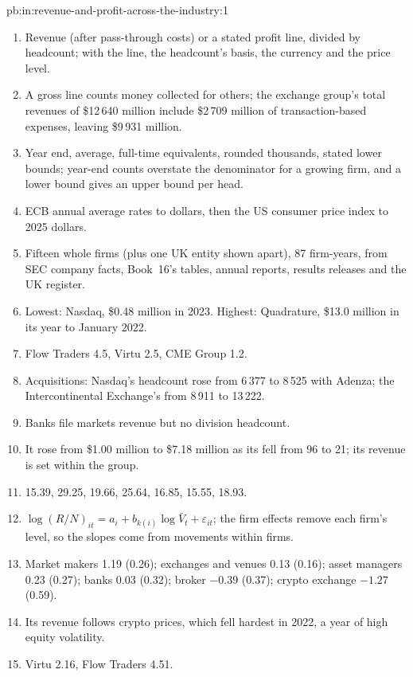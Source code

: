 \begin{solution}{pb:in:revenue-and-profit-across-the-industry:1}
\begin{enumerate}
\item Revenue (after pass-through costs) or a stated profit line, divided by headcount; with the line, the headcount's
basis, the currency and the price level.
\item A gross line counts money collected for others; the exchange group's total revenues of \$12\,640 million include
\$2\,709 million of transaction-based expenses, leaving \$9\,931 million.
\item Year end, average, full-time equivalents, rounded thousands, stated lower bounds; year-end counts overstate the
denominator for a growing firm, and a lower bound gives an upper bound per head.
\item ECB annual average rates to dollars, then the US consumer price index to 2025 dollars.
\item Fifteen whole firms (plus one UK entity shown apart), 87 firm-years, from SEC company facts, Book~16's tables,
annual reports, results releases and the UK register.
\item Lowest: Nasdaq, \$0.48 million in 2023. Highest: Quadrature, \$13.0 million in its year to January 2022.
\item Flow Traders 4.5, Virtu 2.5, CME Group 1.2.
\item Acquisitions: Nasdaq's headcount rose from 6\,377 to 8\,525 with Adenza; the Intercontinental Exchange's from
8\,911 to 13\,222.
\item Banks file markets revenue but no division headcount.
\item It rose from \$1.00 million to \$7.18 million as its  fell from 96 to 21; its revenue is set within
the group.
\item 15.39, 29.25, 19.66, 25.64, 16.85, 15.55, 18.93.
\item $\log(R/N)_{it}=a_i+b_{k(i)}\log\bar V_t+\varepsilon_{it}$; the firm effects remove each firm's level, so the
slopes come from movements within firms.
\item Market makers 1.19 (0.26); exchanges and venues 0.13 (0.16); asset managers 0.23 (0.27); banks 0.03 (0.32);
broker $-0.39$ (0.37); crypto exchange $-1.27$ (0.59).
\item Its revenue follows crypto prices, which fell hardest in 2022, a year of high equity volatility.
\item Virtu 2.16, Flow Traders 4.51.

\end{enumerate}
\end{solution}
